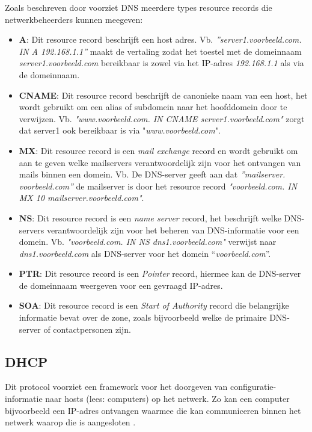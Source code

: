 Zoals beschreven door \textcite{Mockapetris1987} voorziet DNS meerdere types resource records die netwerkbeheerders kunnen meegeven: 
\begin{itemize}
    \item \textbf{A}: Dit resource record beschrijft een host adres. 
    Vb. \textit{”server1.voorbeeld.com. IN A 192.168.1.1”} maakt de vertaling zodat het toestel met de domeinnaam \textit{server1.voorbeeld.com} bereikbaar is zowel via het IP-adres \textit{192.168.1.1} als via de domeinnaam. 
    \item \textbf{CNAME}: Dit resource record beschrijft de canonieke naam van een host, het wordt gebruikt om een alias of subdomein naar het hoofddomein door te verwijzen. Vb. \textit{"www.voorbeeld.com. IN CNAME server1.voorbeeld.com"} zorgt dat server1 ook bereikbaar is via "\textit{www.voorbeeld.com}".
    \item \textbf{MX}: Dit resource record is een \textit{mail exchange} record en wordt gebruikt om aan te geven welke mailservers verantwoordelijk zijn voor het ontvangen van mails binnen een domein. Vb. De DNS-server geeft aan dat \textit{”mailserver.\\voorbeeld.com”} de mailserver is door het resource record \textit{"voorbeeld.com. IN MX 10 mailserver.voorbeeld.com"}.
    \item \textbf{NS}: Dit resource record is een \textit{name server} record, het beschrijft welke DNS-servers verantwoordelijk zijn voor het beheren van DNS-informatie voor een domein. Vb. \textit{"voorbeeld.com. IN NS dns1.voorbeeld.com"} verwijst naar \textit{dns1.voorbeeld.com} als DNS-server voor het domein “\textit{voorbeeld.com}”.
    \item \textbf{PTR}: Dit resource record is een \textit{Pointer} record, hiermee kan de DNS-server de domeinnaam weergeven voor een gevraagd IP-adres.
    \item \textbf{SOA}: Dit resource record is een \textit{Start of Authority} record die belangrijke informatie bevat over de zone, zoals bijvoorbeeld welke de primaire DNS-server of contactpersonen zijn.
\end{itemize}

\subsection{DHCP}
Dit protocol voorziet een framework voor het doorgeven van configuratie-informatie naar hosts (lees: computers) op het netwerk. Zo kan een computer bijvoorbeeld een IP-adres ontvangen waarmee die kan communiceren binnen het netwerk waarop die is aangesloten \autocite{Droms1997}.


